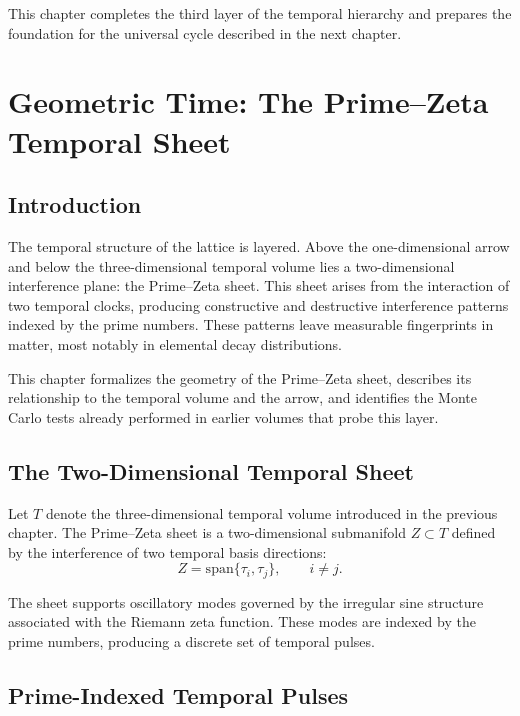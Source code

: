 \documentclass[11pt, letterpaper, openany]{book}
\begin{document}
This chapter completes the third layer of the temporal hierarchy and prepares 
the foundation for the universal cycle described in the next chapter.

\chapter{Geometric Time: The Prime--Zeta Temporal Sheet}
\label{chap:the_prime_zeta}

\section{Introduction}

The temporal structure of the lattice is layered. 
Above the one-dimensional arrow and below the three-dimensional temporal volume 
lies a two-dimensional interference plane: the Prime--Zeta sheet. 
This sheet arises from the interaction of two temporal clocks, producing 
constructive and destructive interference patterns indexed by the prime numbers. 
These patterns leave measurable fingerprints in matter, most notably in 
elemental decay distributions.

This chapter formalizes the geometry of the Prime--Zeta sheet, describes its 
relationship to the temporal volume and the arrow, and identifies the 
Monte Carlo tests already performed in earlier volumes that probe this layer.

\section{The Two-Dimensional Temporal Sheet}

Let $T$ denote the three-dimensional temporal volume introduced in the previous 
chapter. The Prime--Zeta sheet is a two-dimensional submanifold $Z \subset T$ 
defined by the interference of two temporal basis directions:
\[
Z = \mathrm{span}\{\tau_i, \tau_j\}, \qquad i \neq j.
\]

The sheet supports oscillatory modes governed by the irregular sine structure 
associated with the Riemann zeta function. These modes are indexed by the 
prime numbers, producing a discrete set of temporal pulses.

\section{Prime-Indexed Temporal Pulses}
\end{document}
